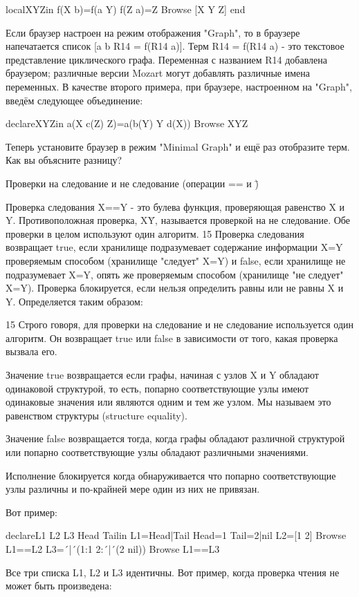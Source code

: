 localXYZin
f(X b)=f(a Y)
f(Z a)=Z
{Browse [X Y Z]}
end

Если браузер настроен на режим отображения "Graph", то в браузере напечатается список [a b R14 = f(R14 a)]. Терм R14 = f(R14 a) - это текстовое представление циклического графа. Переменная с названием R14 добавлена браузером; различные версии Mozart могут добавлять различные имена переменных. В качестве второго примера, при браузере, настроенном на "Graph", введём следующее объединение:

declareXYZin
a(X c(Z) Z)=a(b(Y) Y d(X))
{Browse XYZ}

Теперь установите браузер в режим "Minimal Graph" и ещё раз отобразите терм. Как вы объясните разницу?

Проверки на следование и не следование (операции == и \=)

Проверка следования X==Y - это булева функция, проверяющая равенство X и Y. Противоположная проверка, X\=Y, называется проверкой на не следование. Обе проверки в целом используют один алгоритм. 15 Проверка следования возвращает true, если хранилище подразумевает содержание информации X=Y проверяемым способом (хранилище "следует" X=Y) и false, если хранилище не подразумевает X=Y, опять же проверяемым способом (хранилище "не следует" X=Y). Проверка блокируется, если нельзя определить равны или не равны X и Y. Определяется таким образом:

15 Строго говоря, для проверки на следование и не следование используется один алгоритм. Он возвращает true или false в зависимости от того, какая проверка вызвала его.

Значение true возвращается если графы, начиная с узлов X и Y обладают одинаковой структурой, то есть, попарно соответствующие узлы имеют одинаковые значения или являются одним и тем же узлом. Мы называем это равенством структуры (structure equality).

Значение false возвращается тогда, когда графы обладают различной структурой или попарно соответствующие узлы обладают различными значениями.

Исполнение блокируется когда обнаруживается что попарно соответствующие узлы различны и по-крайней мере один из них не привязан.

Вот пример:

declareL1 L2 L3 Head Tailin
L1=Head|Tail
Head=1
Tail=2|nil
L2=[1 2]
{Browse L1==L2}
L3=´|´(1:1 2:´|´(2 nil))
{Browse L1==L3}

Все три списка L1, L2 и L3 идентичны. Вот пример, когда проверка чтения не может быть произведена:

